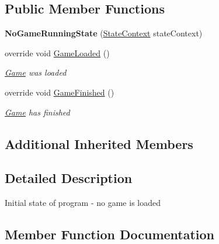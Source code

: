 \subsection*{Public Member Functions}
\begin{DoxyCompactItemize}
\item 
\mbox{\label{class_chess_tracking_1_1_controlling_elements_1_1_program_state_1_1_states_1_1_no_game_running_state_a892c501db88625f85ae06c15197bfe5e}} 
{\bfseries No\+Game\+Running\+State} (\mbox{\hyperlink{class_chess_tracking_1_1_controlling_elements_1_1_program_state_1_1_state_context}{State\+Context}} state\+Context)
\item 
override void \mbox{\hyperlink{class_chess_tracking_1_1_controlling_elements_1_1_program_state_1_1_states_1_1_no_game_running_state_a1e892271241639d1e2a77739a8e58892}{Game\+Loaded}} ()
\begin{DoxyCompactList}\small\item\em \mbox{\hyperlink{namespace_chess_tracking_1_1_game}{Game}} was loaded \end{DoxyCompactList}\item 
override void \mbox{\hyperlink{class_chess_tracking_1_1_controlling_elements_1_1_program_state_1_1_states_1_1_no_game_running_state_a9c8a27c252c9b474ab5357dbbf952bb1}{Game\+Finished}} ()
\begin{DoxyCompactList}\small\item\em \mbox{\hyperlink{namespace_chess_tracking_1_1_game}{Game}} has finished \end{DoxyCompactList}\end{DoxyCompactItemize}
\subsection*{Additional Inherited Members}


\subsection{Detailed Description}
Initial state of program -\/ no game is loaded 



\subsection{Member Function Documentation}
\mbox{\label{class_chess_tracking_1_1_controlling_elements_1_1_program_state_1_1_states_1_1_no_game_running_state_a9c8a27c252c9b474ab5357dbbf952bb1}} 

